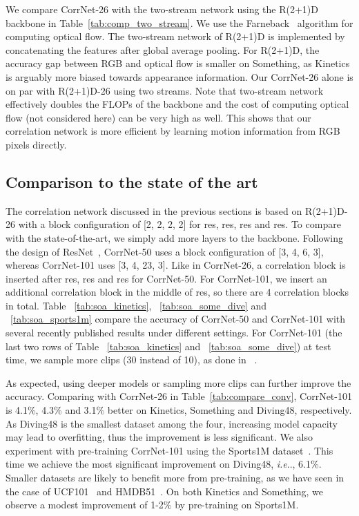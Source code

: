 \documentclass[10pt,twocolumn,letterpaper]{article}
\makeatletter
\DeclareRobustCommand\onedot{\futurelet\@let@token\@onedot}
\def\@onedot{\ifx\@let@token.\else.\null\fi\xspace}
\def\ie{\emph{i.e}\onedot} \def\Ie{\emph{I.e}\onedot}
\makeatother
\begin{document}
We compare CorrNet-26 with the two-stream network using the R(2+1)D backbone in Table~\ref{tab:comp_two_stream}. We use the
Farneback~\cite{farneback2003two} algorithm for computing optical flow. The two-stream network of R(2+1)D is implemented by concatenating the features after global average pooling. For R(2+1)D, the accuracy gap between RGB and optical flow is smaller on Something, as Kinetics is arguably more biased towards appearance information. Our CorrNet-26 alone is on par with R(2+1)D-26 using two streams. Note that two-stream network effectively doubles the FLOPs of the backbone and the cost of computing optical flow (not considered here) can be very high as well. This shows that our correlation network is more efficient by learning motion information from RGB pixels directly.

\subsection{Comparison to the state of the art} \label{sec:compare_sota}

The correlation network discussed in the previous sections is based on R(2+1)D-26  with a block configuration of [2, 2, 2, 2] for res, res, res and res. To compare with the state-of-the-art, we simply add more layers to the backbone. Following the design of ResNet~\cite{KaimingHe16}, CorrNet-50 uses a block configuration of [3, 4, 6, 3], whereas CorrNet-101 uses [3, 4, 23, 3]. Like in CorrNet-26, a correlation block is inserted after res, res and res for CorrNet-50. For CorrNet-101, we insert an additional correlation block in the middle of  res, so there are 4 correlation blocks in total. Table ~\ref{tab:soa_kinetics}, ~\ref{tab:soa_some_dive} and ~\ref{tab:soa_sports1m} compare the accuracy of CorrNet-50 and CorrNet-101 with several recently published results under different settings. For CorrNet-101 (the last two rows of Table ~\ref{tab:soa_kinetics} and ~\ref{tab:soa_some_dive}) at test time, we sample more clips (30 instead of 10), as done in~\cite{wang2017non,wang2018videos} .

As expected, using deeper models or sampling more clips can further improve the accuracy. Comparing with CorrNet-26 in Table~\ref{tab:compare_conv}, CorrNet-101 is 4.1\%, 4.3\% and 3.1\% better on Kinetics, Something and Diving48, respectively. As Diving48 is the smallest dataset among the four, increasing model capacity may lead to overfitting, thus the improvement is less significant. We also experiment with pre-training CorrNet-101 using the Sports1M dataset~\cite{Karpathy14}. This time we achieve the most significant improvement on Diving48, \ie, 6.1\%. Smaller datasets are likely to benefit more from pre-training, as we have seen in the case of UCF101~\cite{UCF101} and HMDB51~\cite{HMDB51}. On both Kinetics and Something, we observe a modest improvement of 1-2\% by pre-training on Sports1M.
\end{document}
